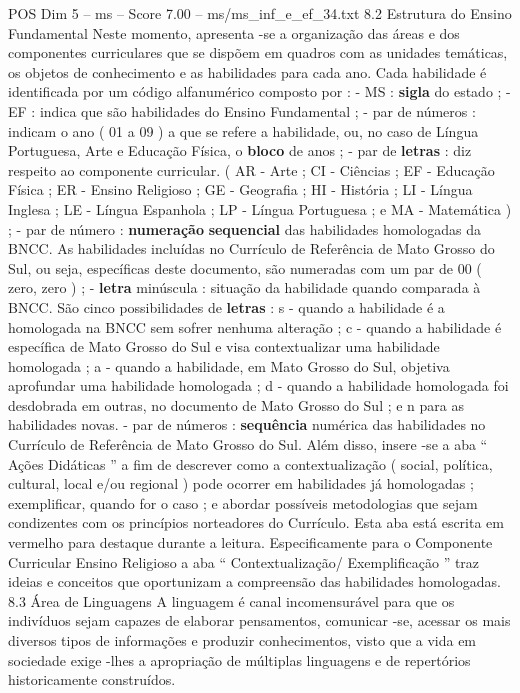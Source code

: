 \begin{textsample}{POS Dim 5 – ms – Score 7.00 – ms/ms\_inf\_e\_ef\_34.txt}  \label{ex:f5_pos_213}
8.2 Estrutura do Ensino Fundamental Neste momento, apresenta -se a organização das áreas e dos componentes curriculares que se dispõem em quadros com as unidades temáticas, os objetos de conhecimento e as habilidades para cada ano.
Cada habilidade é identificada por um código alfanumérico composto por : - MS : \textbf{sigla} do estado ; - EF : indica que são habilidades do Ensino Fundamental ; - par de números : indicam o ano ( 01 a 09 ) a que se refere a habilidade, ou, no caso de Língua Portuguesa, Arte e Educação Física, o \textbf{bloco} de anos ; - par de \textbf{letras} : diz respeito ao componente curricular. ( AR - Arte ; CI - Ciências ; EF - Educação Física ; ER - Ensino Religioso ; GE - Geografia ; HI - História ; LI - Língua Inglesa ; LE - Língua Espanhola ; LP - Língua Portuguesa ; e MA - Matemática ) ; - par de número : \textbf{numeração} \textbf{sequencial} das habilidades homologadas da BNCC.
As habilidades incluídas no Currículo de Referência de Mato Grosso do Sul, ou seja, específicas deste documento, são numeradas com um par de 00 ( zero, zero ) ; - \textbf{letra} minúscula : situação da habilidade quando comparada à BNCC.
São cinco possibilidades de \textbf{letras} : s - quando a habilidade é a homologada na BNCC sem sofrer nenhuma alteração ; c - quando a habilidade é específica de Mato Grosso do Sul e visa contextualizar uma habilidade homologada ; a - quando a habilidade, em Mato Grosso do Sul, objetiva aprofundar uma habilidade homologada ; d - quando a habilidade homologada foi desdobrada em outras, no documento de Mato Grosso do Sul ; e n para as habilidades novas. - par de números : \textbf{sequência} numérica das habilidades no Currículo de Referência de Mato Grosso do Sul.
Além disso, insere -se a aba “ Ações Didáticas ” a fim de descrever como a contextualização ( social, política, cultural, local e/ou regional ) pode ocorrer em habilidades já homologadas ; exemplificar, quando for o caso ; e abordar possíveis metodologias que sejam condizentes com os princípios norteadores do Currículo.
Esta aba está escrita em vermelho para destaque durante a leitura.
Especificamente para o Componente Curricular Ensino Religioso a aba “ Contextualização/ Exemplificação ” traz ideias e conceitos que oportunizam a compreensão das habilidades homologadas. 8.3 Área de Linguagens A linguagem é canal incomensurável para que os indivíduos sejam capazes de elaborar pensamentos, comunicar -se, acessar os mais diversos tipos de informações e produzir conhecimentos, visto que a vida em sociedade exige -lhes a apropriação de múltiplas linguagens e de repertórios historicamente construídos.

\end{textsample}
